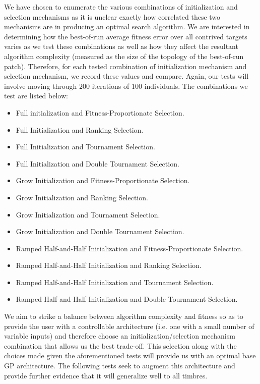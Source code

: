 \documentclass[a4paper,12pt]{report} 	%
\numberwithin{figure}{chapter}
\numberwithin{table}{chapter}
\numberwithin{equation}{chapter}
\begin{document}
\begin{flushleft}
We have chosen to enumerate the various combinations of initialization and selection mechanisms as it is unclear exactly how correlated these two mechanisms are in producing an optimal search algorithm. We are interested in determining how the best-of-run average fitness error over all contrived targets varies as we test these combinations as well as how they affect the resultant algorithm complexity (measured as the size of the topology of the best-of-run patch). Therefore, for each tested combination of initialization mechanism and selection mechanism, we record these values and compare. Again, our tests will involve moving through $200$ iterations of $100$ individuals. The combinations we test are listed below:
\begin{itemize}
\item Full initialization and Fitness-Proportionate Selection.
\item Full Initialization and Ranking Selection.
\item Full Initialization and Tournament Selection.
\item Full Initialization and Double Tournament Selection.
\item Grow Initialization and Fitness-Proportionate Selection.
\item Grow Initialization and Ranking Selection.
\item Grow Initialization and Tournament Selection.
\item Grow Initialization and Double Tournament Selection.
\item Ramped Half-and-Half Initialization and Fitness-Proportionate Selection.
\item Ramped Half-and-Half Initialization and Ranking Selection.
\item Ramped Half-and-Half Initialization and Tournament Selection.
\item Ramped Half-and-Half Initialization and Double Tournament Selection.
\end{itemize}
We aim to strike a balance between algorithm complexity and fitness so as to provide the user with a controllable architecture (i.e. one with a small number of variable inputs) and therefore choose an initialization/selection mechanism combination that allows us the best trade-off. This selection along with the choices made given the aforementioned tests will provide us with an optimal base GP architecture. The following tests seek to augment this architecture and provide further evidence that it will generalize well to all timbres.


\end{flushleft}
\end{document}

